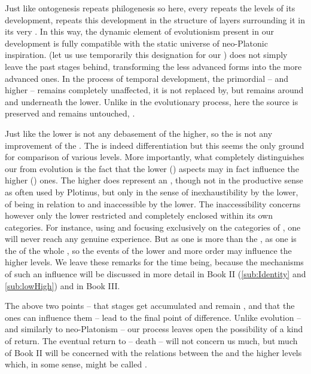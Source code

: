 Just like  ontogenesis repeats philogenesis so here, every  repeats
the levels of its development, repeats this development in the structure of
layers surrounding it in its very .  In this way, the dynamic
element of evolutionism present in our development is fully compatible with the
static universe of neo-Platonic inspiration.   (let us use
temporarily this designation for our ) does not simply leave
the past stages behind, transforming the less advanced forms into the more
advanced ones. In the process of temporal development, the primordial -- and
higher -- remains completely unaffected, it is not replaced by, but remains
around and underneath the lower. Unlike in the evolutionary process, here the
source is preserved and remains untouched, .

Just like the lower is not any debasement of the higher, so the  is
not any improvement of the . The  is indeed
differentiation but this seems the only ground for comparison of various levels.
More importantly, what completely distinguishes our  from
evolution is the fact that the lower () aspects may in fact influence
the higher () ones. The higher does represent an ,
though not in the productive sense as often used by Plotinus, but only in the
sense of inexhaustibility by the lower, of being  in relation
to and inaccessible by the lower. The inaccessibility concerns however only the
lower restricted and completely enclosed within its own categories. For
instance, using and focusing exclusively on the categories of , one will never reach any genuine experience. But as one is more
than the , as one is the  of the whole
, so the events of the lower and more  order may
influence the higher levels. We leave these remarks for the time being, because
the mechanisms of such an influence will be discussed in more detail in Book II
(\ref{sub:Identity} and \ref{sub:lowHigh}) and in Book III.

The above two points -- that  stages get accumulated and remain
, and that the  ones can influence them -- lead to the
final point of difference.  Unlike evolution -- and similarly to neo-Platonism
-- our process leaves open the possibility of a kind of return.  The eventual return to  --
death -- will not concern us much, but much of Book II will be concerned with
the relations between the  and the higher levels which, in
some sense, might be called .

